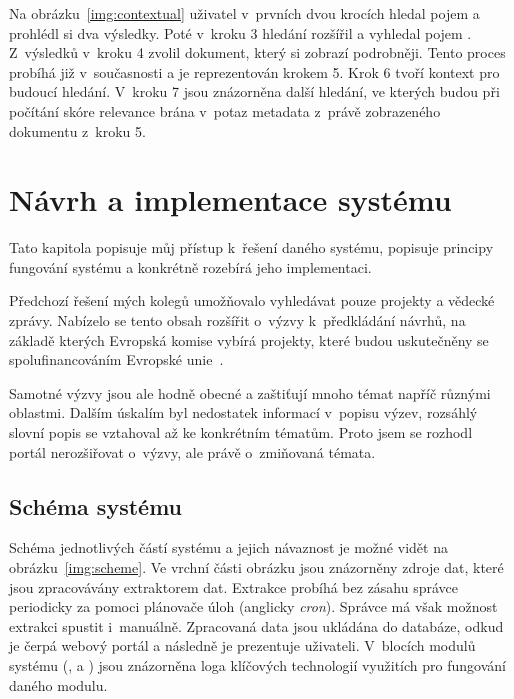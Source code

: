 Na obrázku~\ref{img:contextual} uživatel v~prvních dvou krocích hledal pojem  a prohlédl si dva výsledky. Poté v~kroku 3 hledání rozšířil a vyhledal pojem . Z~výsledků v~kroku 4 zvolil dokument, který si zobrazí podrobněji. Tento proces probíhá již v~současnosti a je reprezentován krokem 5. Krok 6 tvoří kontext pro budoucí hledání. V~kroku 7 jsou znázorněna další hledání, ve kterých budou při počítání skóre relevance brána v~potaz metadata z~právě zobrazeného dokumentu z~kroku 5.





\chapter{Návrh a implementace systému}
Tato kapitola popisuje můj přístup k~řešení daného systému, popisuje principy fungování systému a konkrétně rozebírá jeho implementaci.

Předchozí řešení mých kolegů umožňovalo vyhledávat pouze projekty a vědecké zprávy. Nabízelo se tento obsah rozšířit o~výzvy k~předkládání návrhů, na základě kterých Evropská komise vybírá projekty, které budou uskutečněny se spolufinancováním Evropské unie~\cite{bib:funding-about}.

Samotné výzvy jsou ale hodně obecné a zaštiťují mnoho témat napříč různými oblastmi. Dalším úskalím byl nedostatek informací v~popisu výzev, rozsáhlý slovní popis se vztahoval až ke konkrétním tématům. Proto jsem se rozhodl portál nerozšiřovat o~výzvy, ale právě o~zmiňovaná témata.

\section{Schéma systému}
Schéma jednotlivých částí systému a jejich návaznost je možné vidět na obrázku~\ref{img:scheme}. Ve vrchní části obrázku jsou znázorněny zdroje dat, které jsou zpracovávány extraktorem dat. Extrakce probíhá bez zásahu správce periodicky za pomoci plánovače úloh (anglicky \emph{cron}). Správce má však možnost extrakci spustit i~manuálně. Zpracovaná data jsou ukládána do databáze, odkud je čerpá webový portál a následně je prezentuje uživateli. V~blocích modulů systému (,  a ) jsou znázorněna loga klíčových technologií využitích pro fungování daného modulu.

